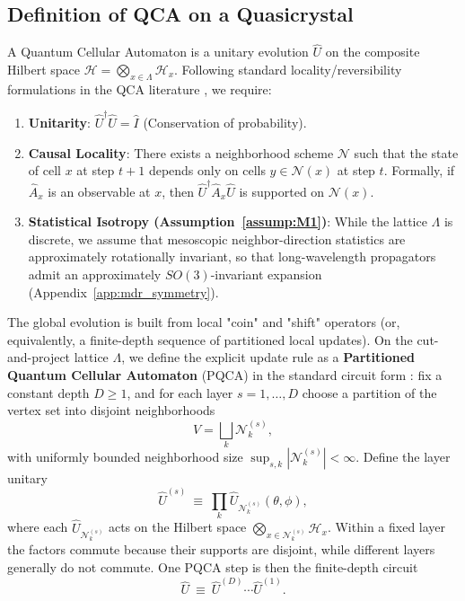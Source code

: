 \subsection{Definition of QCA on a Quasicrystal}
A Quantum Cellular Automaton is a unitary evolution $\hat{U}$ on the composite Hilbert space $\mathcal{H} = \bigotimes_{x \in \Lambda} \mathcal{H}_x$. Following standard locality/reversibility formulations in the QCA literature \cite{Watrous1995QCA,SchumacherWerner2004,Dariano2014}, we require:
\begin{enumerate}
    \item \textbf{Unitarity}: $\hat{U}^\dagger \hat{U} = \hat{I}$ (Conservation of probability).
    \item \textbf{Causal Locality}: There exists a neighborhood scheme $\mathcal{N}$ such that the state of cell $x$ at step $t+1$ depends only on cells $y \in \mathcal{N}(x)$ at step $t$. Formally, if $\hat{A}_x$ is an observable at $x$, then $\hat{U}^\dagger \hat{A}_x \hat{U}$ is supported on $\mathcal{N}(x)$.
    \item \textbf{Statistical Isotropy (Assumption~\ref{assump:M1})}: While the lattice $\Lambda$ is discrete, we assume that mesoscopic neighbor-direction statistics are approximately rotationally invariant, so that long-wavelength propagators admit an approximately $SO(3)$-invariant expansion (Appendix~\ref{app:mdr_symmetry}).
\end{enumerate}

The global evolution is built from local "coin" and "shift" operators (or, equivalently, a finite-depth sequence of partitioned local updates). On the cut-and-project lattice $\Lambda$, we define the explicit update rule as a \textbf{Partitioned Quantum Cellular Automaton} (PQCA) in the standard circuit form \cite{Watrous1995QCA,SchumacherWerner2004}: fix a constant depth $D\ge 1$, and for each layer $s=1,\dots,D$ choose a partition of the vertex set into disjoint neighborhoods
\begin{equation}
    V=\bigsqcup_k \mathcal{N}_k^{(s)},
\end{equation}
with uniformly bounded neighborhood size $\sup_{s,k}|\mathcal{N}_k^{(s)}|<\infty$. Define the layer unitary
\begin{equation}
    \hat U^{(s)}\ \equiv\ \prod_k \hat U_{\mathcal{N}_k^{(s)}}(\theta,\phi),
\end{equation}
where each $\hat U_{\mathcal{N}_k^{(s)}}$ acts on the Hilbert space $\bigotimes_{x\in \mathcal{N}_k^{(s)}}\mathcal{H}_x$. Within a fixed layer the factors commute because their supports are disjoint, while different layers generally do not commute. One PQCA step is then the finite-depth circuit
\begin{equation}
    \hat U \ \equiv\ \hat U^{(D)}\cdots \hat U^{(1)}.
\end{equation}

